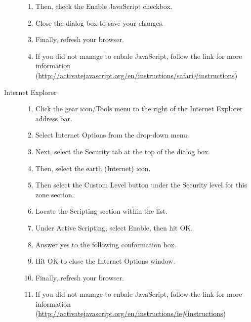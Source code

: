 \begin{description}
\begin{enumerate}
\item Then, check the Enable JavaScript checkbox.
\item Close the dialog box to save your changes.
\item Finally, refresh your browser.
\item If you did not manage to enbale JavaScript, follow the link for more information (\href{http://activatejavascript.org/en/instructions/safari\#instructions}{http://activatejavascript.org/en/instructions/safari\#instructions})
\end{enumerate}
\item[Internet Explorer] \hfill 
\begin{enumerate}
\item Click the gear icon/Tools menu to the right of the Internet Explorer address bar.
\item Select Internet Options from the drop-down menu.
\item Next, select the Security tab at the top of the dialog box.
\item Then, select the earth (Internet) icon.
\item Then select the Custom Level button under the Security level for this zone section.
\item Locate the Scripting section within the list.
\item Under Active Scripting, select Enable, then hit OK.
\item Answer yes to the following conformation box.
\item Hit OK to close the Internet Options window.
\item Finally, refresh your browser.
\item If you did not manage to enbale JavaScript, follow the link for more information (\href{http://activatejavascript.org/en/instructions/ie\#instructions}{http://activatejavascript.org/en/instructions/ie\#instructions})
\end{enumerate}
\end{description}

